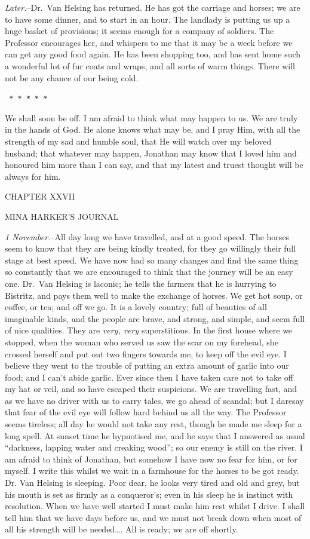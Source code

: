 \documentclass[12pt,openright]{book}
\begin{document}
\textit{Later.}–Dr. Van Helsing has returned. He has got the carriage and horses; we are to have some dinner, and to start in an hour. The landlady is putting us up a huge basket of provisions; it seems enough for a company of soldiers. The Professor encourages her, and whispers to me that it may be a week before we can get any good food again. He has been shopping too, and has sent home such a wonderful lot of fur coats and wraps, and all sorts of warm things. There will not be any chance of our being cold.

\texttt{   *       *       *       *       *}

We shall soon be off. I am afraid to think what may happen to us. We are truly in the hands of God. He alone knows what may be, and I pray Him, with all the strength of my sad and humble soul, that He will watch over my beloved husband; that whatever may happen, Jonathan may know that I loved him and honoured him more than I can say, and that my latest and truest thought will be always for him.

CHAPTER XXVII

MINA HARKER’S JOURNAL

\textit{1 November.}–All day long we have travelled, and at a good speed. The horses seem to know that they are being kindly treated, for they go willingly their full stage at best speed. We have now had so many changes and find the same thing so constantly that we are encouraged to think that the journey will be an easy one. Dr. Van Helsing is laconic; he tells the farmers that he is hurrying to Bistritz, and pays them well to make the exchange of horses. We get hot soup, or coffee, or tea; and off we go. It is a lovely country; full of beauties of all imaginable kinds, and the people are brave, and strong, and simple, and seem full of nice qualities. They are \textit{very, very} superstitious. In the first house where we stopped, when the woman who served us saw the scar on my forehead, she crossed herself and put out two fingers towards me, to keep off the evil eye. I believe they went to the trouble of putting an extra amount of garlic into our food; and I can’t abide garlic. Ever since then I have taken care not to take off my hat or veil, and so have escaped their suspicions. We are travelling fast, and as we have no driver with us to carry tales, we go ahead of scandal; but I daresay that fear of the evil eye will follow hard behind us all the way. The Professor seems tireless; all day he would not take any rest, though he made me sleep for a long spell. At sunset time he hypnotised me, and he says that I answered as usual “darkness, lapping water and creaking wood”; so our enemy is still on the river. I am afraid to think of Jonathan, but somehow I have now no fear for him, or for myself. I write this whilst we wait in a farmhouse for the horses to be got ready. Dr. Van Helsing is sleeping. Poor dear, he looks very tired and old and grey, but his mouth is set as firmly as a conqueror’s; even in his sleep he is instinct with resolution. When we have well started I must make him rest whilst I drive. I shall tell him that we have days before us, and we must not break down when most of all his strength will be needed…. All is ready; we are off shortly.
\end{document}
